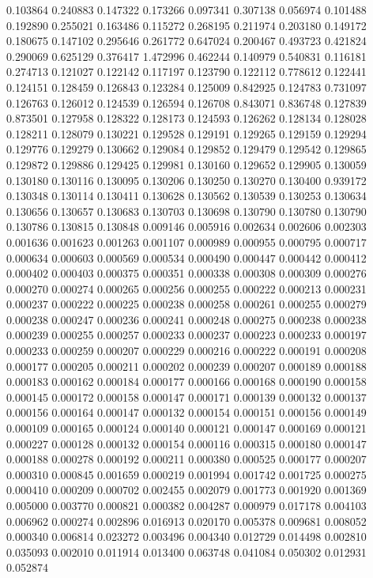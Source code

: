 0.103864
0.240883
0.147322
0.173266
0.097341
0.307138
0.056974
0.101488
0.192890
0.255021
0.163486
0.115272
0.268195
0.211974
0.203180
0.149172
0.180675
0.147102
0.295646
0.261772
0.647024
0.200467
0.493723
0.421824
0.290069
0.625129
0.376417
1.472996
0.462244
0.140979
0.540831
0.116181
0.274713
0.121027
0.122142
0.117197
0.123790
0.122112
0.778612
0.122441
0.124151
0.128459
0.126843
0.123284
0.125009
0.842925
0.124783
0.731097
0.126763
0.126012
0.124539
0.126594
0.126708
0.843071
0.836748
0.127839
0.873501
0.127958
0.128322
0.128173
0.124593
0.126262
0.128134
0.128028
0.128211
0.128079
0.130221
0.129528
0.129191
0.129265
0.129159
0.129294
0.129776
0.129279
0.130662
0.129084
0.129852
0.129479
0.129542
0.129865
0.129872
0.129886
0.129425
0.129981
0.130160
0.129652
0.129905
0.130059
0.130180
0.130116
0.130095
0.130206
0.130250
0.130270
0.130400
0.939172
0.130348
0.130114
0.130411
0.130628
0.130562
0.130539
0.130253
0.130634
0.130656
0.130657
0.130683
0.130703
0.130698
0.130790
0.130780
0.130790
0.130786
0.130815
0.130848
0.009146
0.005916
0.002634
0.002606
0.002303
0.001636
0.001623
0.001263
0.001107
0.000989
0.000955
0.000795
0.000717
0.000634
0.000603
0.000569
0.000534
0.000490
0.000447
0.000442
0.000412
0.000402
0.000403
0.000375
0.000351
0.000338
0.000308
0.000309
0.000276
0.000270
0.000274
0.000265
0.000256
0.000255
0.000222
0.000213
0.000231
0.000237
0.000222
0.000225
0.000238
0.000258
0.000261
0.000255
0.000279
0.000238
0.000247
0.000236
0.000241
0.000248
0.000275
0.000238
0.000238
0.000239
0.000255
0.000257
0.000233
0.000237
0.000223
0.000233
0.000197
0.000233
0.000259
0.000207
0.000229
0.000216
0.000222
0.000191
0.000208
0.000177
0.000205
0.000211
0.000202
0.000239
0.000207
0.000189
0.000188
0.000183
0.000162
0.000184
0.000177
0.000166
0.000168
0.000190
0.000158
0.000145
0.000172
0.000158
0.000147
0.000171
0.000139
0.000132
0.000137
0.000156
0.000164
0.000147
0.000132
0.000154
0.000151
0.000156
0.000149
0.000109
0.000165
0.000124
0.000140
0.000121
0.000147
0.000169
0.000121
0.000227
0.000128
0.000132
0.000154
0.000116
0.000315
0.000180
0.000147
0.000188
0.000278
0.000192
0.000211
0.000380
0.000525
0.000177
0.000207
0.000310
0.000845
0.001659
0.000219
0.001994
0.001742
0.001725
0.000275
0.000410
0.000209
0.000702
0.002455
0.002079
0.001773
0.001920
0.001369
0.005000
0.003770
0.000821
0.000382
0.004287
0.000979
0.017178
0.004103
0.006962
0.000274
0.002896
0.016913
0.020170
0.005378
0.009681
0.008052
0.000340
0.006814
0.023272
0.003496
0.004340
0.012729
0.014498
0.002810
0.035093
0.002010
0.011914
0.013400
0.063748
0.041084
0.050302
0.012931
0.052874
